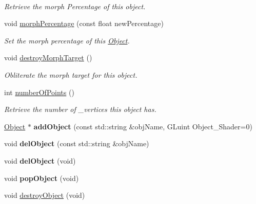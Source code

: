 \begin{DoxyCompactItemize}
$$\begin{DoxyCompactList}\small\item\em Retrieve the morph Percentage of this object. \end{DoxyCompactList}\item 
void \hyperlink{class_object_a543d2329b25df9fb0a782f09d03e5cb1}{morph\-Percentage} (const float new\-Percentage)
\begin{DoxyCompactList}\small\item\em Set the morph percentage of this \hyperlink{class_object}{Object}. \end{DoxyCompactList}\item 
\hypertarget{class_object_a98d3f1b9ebb61c3b21e2a59ed267480a}{void \hyperlink{class_object_a98d3f1b9ebb61c3b21e2a59ed267480a}{destroy\-Morph\-Target} ()}\label{class_object_a98d3f1b9ebb61c3b21e2a59ed267480a}

\begin{DoxyCompactList}\small\item\em Obliterate the morph target for this object. \end{DoxyCompactList}\item 
int \hyperlink{class_object_a73f1a6210bacf504de9a808009479b81}{number\-Of\-Points} ()
\begin{DoxyCompactList}\small\item\em Retrieve the number of \-\_\-vertices this object has. \end{DoxyCompactList}\item 
\hypertarget{class_scene_aa5a48614e959c38c35d824fa9d6a4b8b}{\hyperlink{class_object}{Object} $\ast$ {\bfseries add\-Object} (const std\-::string \&obj\-Name, G\-Luint Object\-\_\-\-Shader=0)}\label{class_scene_aa5a48614e959c38c35d824fa9d6a4b8b}

\item 
\hypertarget{class_scene_a2a6845dacbb468c5c097c7a6ab5a0fe0}{void {\bfseries del\-Object} (const std\-::string \&obj\-Name)}\label{class_scene_a2a6845dacbb468c5c097c7a6ab5a0fe0}

\item 
\hypertarget{class_scene_a2e6b319b60e27e66ad43bb942a6c4424}{void {\bfseries del\-Object} (void)}\label{class_scene_a2e6b319b60e27e66ad43bb942a6c4424}

\item 
\hypertarget{class_scene_ad6c9d1d1d0c786d39bf97dc60410e28b}{void {\bfseries pop\-Object} (void)}\label{class_scene_ad6c9d1d1d0c786d39bf97dc60410e28b}

\item 
\hypertarget{class_scene_a8c57e1cebc39586c7928225d1e25de39}{void \hyperlink{class_scene_a8c57e1cebc39586c7928225d1e25de39}{destroy\-Object} (void)}\label{class_scene_a8c57e1cebc39586c7928225d1e25de39}


\end{DoxyCompactItemize}
